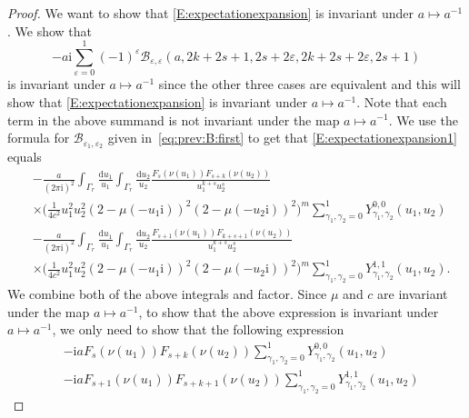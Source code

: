 \documentclass[11pt,twoside]{amsart}
\theoremstyle{plain}
\numberwithin{quest}{section}
\theoremstyle{remark}
\numberwithin{rem}{section}
\theoremstyle{definition}
\newcommand{\eps}{\varepsilon}
\begin{document}
\begin{proof}
		We want to show that \eqref{E:expectationexpansion} is invariant under $a \mapsto a^{-1}$.  We show that 
		\begin{equation}\label{E:expectationexpansion1}
			-a \mathrm{i} \sum_{\eps=0}^1(-1)^\eps  
			\mathcal{B}_{\eps,\eps}(a,2k+2s+1,2s+2\eps,2k+2s+2\eps,2s+1)
		\end{equation}
		is invariant under $a \mapsto a^{-1}$ since the other three cases are equivalent and this will show that \eqref{E:expectationexpansion} is invariant under $a \mapsto a^{-1}$.    Note that each term in the  above summand is not invariant under the map $a \mapsto a^{-1}$. We use the formula for $\mathcal{B}_{\eps_1,\eps_2}$ given in~\eqref{eq:prev:B:first} to get that \eqref{E:expectationexpansion1} equals
		\begin{equation*}
			\begin{split}
				&-\frac{a}{(2\pi \mathrm{i})^2} \int_{\Gamma_r} \frac{\mathrm{d}u_1}{u_1} \int_{\Gamma_r}\frac{\mathrm{d}u_2}{u_2} \frac{F_{s} (\nu(u_1)) F_{s+k} (\nu(u_2))}{u_1^{k+s} u_2^{s}} \\ 
				&\times \Bigg( \frac{1}{4c^2} u_1^2 u_2^2 (2-\mu(-u_1 \mathrm{i}))^2 (2-\mu(-u_2 \mathrm{i}))^2\Bigg)^m \sum_{\gamma_1,\gamma_2=0}^1  Y_{\gamma_1,\gamma_2}^{0,0}(u_1,u_2)\\
				&-\frac{a}{(2\pi \mathrm{i})^2} \int_{\Gamma_r} \frac{\mathrm{d}u_1}{u_1} \int_{\Gamma_r}\frac{\mathrm{d}u_2}{u_2} \frac{F_{s+1} (\nu(u_1)) F_{k+s+1} (\nu(u_2))}{u_1^{k+s} u_2^s} \\ 
				&\times \Bigg( \frac{1}{4c^2} u_1^2 u_2^2 (2-\mu(-u_1 \mathrm{i}))^2 (2-\mu(-u_2 \mathrm{i}))^2\Bigg)^m \sum_{\gamma_1,\gamma_2=0}^1 Y_{\gamma_1,\gamma_2}^{1,1}(u_1,u_2).
			\end{split}
		\end{equation*}
		We combine both of the above integrals and factor. Since $\mu$ and $c$ are invariant under the map $a \mapsto a^{-1}$, to show that the above expression is invariant under $a \mapsto a^{-1}$, we only need to show that the following expression
		\begin{equation}\label{eq:expofFterms}
			\begin{split}
				&-\mathrm{i} a F_s(\nu (u_1)) F_{s+k} (\nu (u_2)) \sum_{\gamma_1,\gamma_2=0}^1 Y_{\gamma_1,\gamma_2}^{0,0}(u_1,u_2)  \\ & -\mathrm{i} a F_{s+1} (\nu (u_1)) F_{s+k+1} (\nu (u_2)) \sum_{\gamma_1,\gamma_2=0}^1 Y_{\gamma_1,\gamma_2}^{1,1}(u_1,u_2) 
			\end{split}
		\end{equation}

\end{proof}
\end{document}
